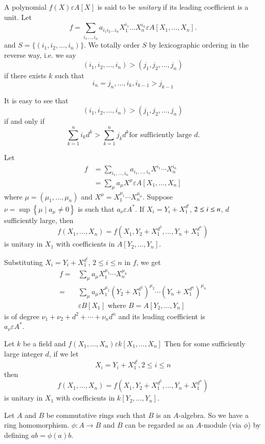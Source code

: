 \begin{dfn}\label{c2:dfn2.5}
A polynomial $f(X)\varepsilon A[X]$ is said to be \textit{unitary} if
its leading coefficient is a unit. Let 
$$
f=\sum\limits_{i_1\ldots,i_n}a_{i_{1}i_{2}\ldots
  i_{n}}X^{i_{1}}_1\ldots X^{i_{n}}_n\varepsilon A[X_1,\ldots,X_n].
$$
and $S=\{(i_1,i_2,\ldots,i_n)\}$. We totally order $S$ by
lexicographic ordering in the reverse way, i.e. we say
$$
(i_1,i_2,\ldots,i_n)>(j_1,j_2,\ldots,j_n)
$$
if there exists $k$ such that 
$$
i_n=j_n,\ldots,i_k,i_{k-1}>j_{k-1}
$$

It is easy to see that 
$$
(i_1,i_2,\ldots,i_n)>(j_1,j_2,\ldots,j_n)
$$
if and only if
$$
\sum\limits_{k=1}^{n}i_kd^{k}>\sum\limits_{k=1}^{n} j_kd^{k} \text{
  for sufficiently large } d.
$$
\end{dfn}

\begin{lem}\label{c2:lem2.6}
Let 
\begin{align*}
f&=\sum\limits_{i_1,\ldots,i_n}a_{i_1,\ldots,i_n}X^{i_1}\cdots
X^{i_n}_n\\
&=\sum\limits_{\mu}a_{\mu}X^{\mu}\varepsilon A[X_1,\ldots,X_n]
\end{align*}
where $\mu=(\mu_1,\ldots,\mu_n)$ and $X^{\mu}=X^{\mu_1}_1\cdots
X^{\mu_n}_n$. Suppose \\$\nu=\sup\left\{\mu\mid a_{\mu}\neq
0\right\}$ is such that $a_{\nu}\varepsilon A^{\ast}$. If
$X_i=Y_i+X^{d^{i}}_1$, $2\leq \\i\leq n$, $d$ sufficiently large, then
$$
f(X_1,\ldots,X_n)=f\left(X_1,Y_2+X^{d^{2}}_1,\ldots,Y_n+X^{d^{n}}_1\right)
$$
is unitary in $X_1$ with coefficients in $A[Y_2,\ldots,Y_n]$.
\end{lem}

\begin{Proof}
Substituting $X_i=Y_i+X^{d^{i}}_1$, $2\leq i\leq n$ in $f$, we get 
$$
\begin{aligned}
f=&\sum\limits_{\mu}a_{\mu}X^{\mu_1}_1\cdots X^{\mu_n}_n\\
=&\sum\limits_{\mu}a_{\mu}X^{\mu_1}_1\left(Y_2+X^{d^{2}}_1\right)^{\mu_2}\cdots\left(Y_n+X^{d^{n}}_1\right)^{\mu_n}\\
&\varepsilon B[X_1] \text{ where } B=A[Y_2,\ldots,Y_n]
\end{aligned}
$$
is of degree $\nu_1+\nu_2+d^{2}+\cdots+\nu_nd^{n}$ and its leading
coefficient is\\ $a_{\nu} \varepsilon A^{\ast}$.
\enprf
\end{Proof}

\begin{coro}\label{c2:coro2.7}
Let $k$ be a field and $f(X_1,\ldots,X_n)\varepsilon
k[X_1,\ldots,X_n]$ Then for some sufficiently large integer $d$, if we
let 
$$
X_i=Y_i+X^{d^{i}}_1, 2\leq i\leq n
$$
then
$$
f(X_1,\ldots,X_n)=f\left(X_1,Y_2+X^{d^{2}}_1,\ldots,Y_n+X^{d^{n}}_1\right)
$$
is unitary in $X_1$ with coefficients in $k[Y_2,\ldots,Y_n]$.

Let $A$ and $B$ be commutative rings such that $B$ is an
$A$-algebra. So we have a ring homomorphism. $\phi: A\rightarrow B$
and $B$ can be regarded as an $A$-module (via $\phi$) by defining $ab=\phi(a)b$.
\end{coro}

